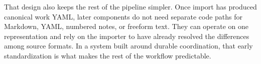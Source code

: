 \documentclass[11pt]{article}
\begin{document}
That design also keeps the rest of the pipeline simpler. Once import has produced canonical work YAML, later components do not need separate code paths for Markdown, YAML, numbered notes, or freeform text. They can operate on one representation and rely on the importer to have already resolved the differences among source formats. In a system built around durable coordination, that early standardization is what makes the rest of the workflow predictable.
\end{document}
